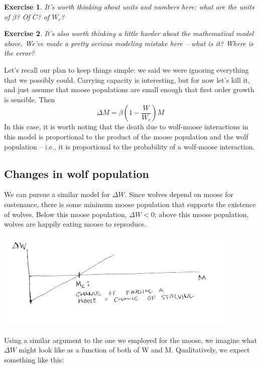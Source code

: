 \documentclass{tufte-handout}
\newtheorem{del}{Exercise}
\begin{document}
\begin{del}
 It's worth thinking about units and numbers here:  what are the units of $\beta$?  Of $C$?  of $W_c$?
\end{del}

\begin{del}
It's also worth thinking a little harder about the mathematical model above.  We've made a pretty serious modeling mistake here -- what is it?  Where is the error?
\end{del}

Let's recall our plan to keep things simple:  we said we were ignoring everything that we possibly could.  Carrying capacity is interesting, but for now let's kill it, and just assume that moose populations are small enough that first order growth is sensible.  Then
$$\Delta M = \beta(1-\frac{W}{W_c})M$$
In this case, it is worth noting that the death due to wolf-moose interactions in this model is proportional to the product of the moose population and the wolf population -- i.e., it is proportional to the probability of  a wolf-moose interaction.  

\subsection{Changes in wolf population}
We can pursue a similar model for $\Delta W$.  Since wolves depend on moose for sustenance, there is some minimum moose population that supports the existence of wolves.  Below this moose population, $\Delta W <0$; above this moose population, wolves are happily eating moose to reproduce. 


\includegraphics[width=12cm]{figs/DeltaWvsM}


Using a similar argument to the one we employed for the moose, we imagine what $\Delta W$ might look like as a function of both of W and M. Qualitatively, we expect something like this:
\end{document}
